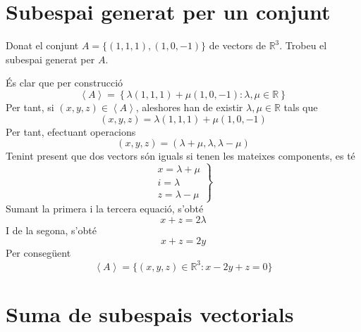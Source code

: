 \section{Subespai generat per un conjunt}

\begin{exercici}
Donat el conjunt $A=\{(1,1,1),(1,0,-1)\}$ de vectors de $\mathbb{R}^{3}$.
Trobeu el subespai generat per $A$.

\end{exercici}
\begin{solucio}
És clar que per construcció%
\begin{equation*}
\left\langle A\right\rangle =\left\{ \lambda (1,1,1)+\mu (1,0,-1):\lambda
,\mu \in \mathbb{R}\right\}
\end{equation*}%
Per tant, si $(x,y,z)\in \left\langle A\right\rangle $, aleshores han de
existir $\lambda ,\mu \in \mathbb{R}$ tals que%
\begin{equation*}
(x,y,z)=\lambda (1,1,1)+\mu (1,0,-1)
\end{equation*}%
Per tant, efectuant operacions%
\begin{equation*}
(x,y,z)=(\lambda +\mu ,\lambda ,\lambda -\mu )
\end{equation*}%
Tenint present que dos vectors són iguals si tenen les mateixes
components, es té%
\begin{equation*}
\left.
\begin{array}{l}
x=\lambda +\mu \\
i=\lambda \\
z=\lambda -\mu%
\end{array}%
\right\}
\end{equation*}%
Sumant la primera i la tercera equació, s’obté%
\begin{equation*}
x+z=2\lambda
\end{equation*}%
I de la segona, s’obté%
\begin{equation*}
x+z=2y
\end{equation*}%
Per consegüent%
\begin{equation*}
\left\langle A\right\rangle =\{(x,y,z)\in \mathbb{R}^{3}:x-2y+z=0\}
\end{equation*}
\end{solucio}

\section{Suma de subespais vectorials}

